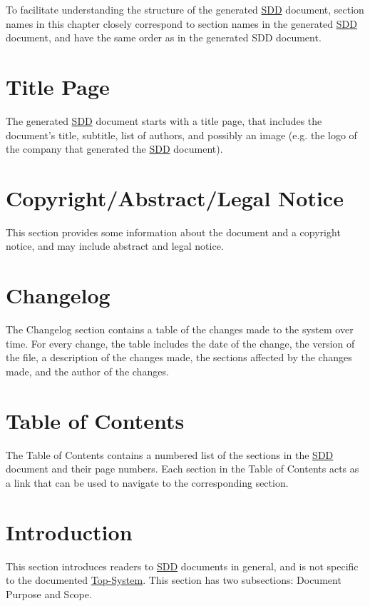 \documentclass{mcscert}
\newcommand{\topsystemnolink}{Top-System} %
\newcommand{\topsystem}{\hyperref[def:topsystem]{\topsystemnolink{}}}
\begin{document}
To facilitate understanding the structure of the generated \hyperref[acr:sdd]{SDD} document, section names in this chapter closely correspond to section names in the generated \hyperref[acr:sdd]{SDD} document, and have the same order as in the generated SDD document.

\section{Title Page} 
\label{sec:title-page}
The generated \hyperref[acr:sdd]{SDD} document starts with a title page, that includes the document's title, subtitle, list of authors, and possibly an image (e.g. the logo of the company that generated the \hyperref[acr:sdd]{SDD} document).

\section{Copyright/Abstract/Legal Notice}
This section provides some information about the document and a copyright notice, and may include abstract and legal notice.

\section{Changelog}
\label{sec:changelog}
The Changelog section contains a table of the changes made to the system over time. 
For every change, the table includes the date of the change, the version of the file, a description of the changes made, the sections affected by the changes made, and the author of the changes.

\section{Table of Contents}
\label{sec:toc}
The Table of Contents contains a numbered list of the sections in the \hyperref[acr:sdd]{SDD} document and their page numbers. 
Each section in the Table of Contents acts as a link that can be used to navigate to the corresponding section.

\section{Introduction}
\label{sec:intro-description}
This section introduces readers to \hyperref[acr:sdd]{SDD} documents in general, and is not specific to the documented \topsystem{}. 
This section has two subsections: Document Purpose and Scope.
  
\end{document}
